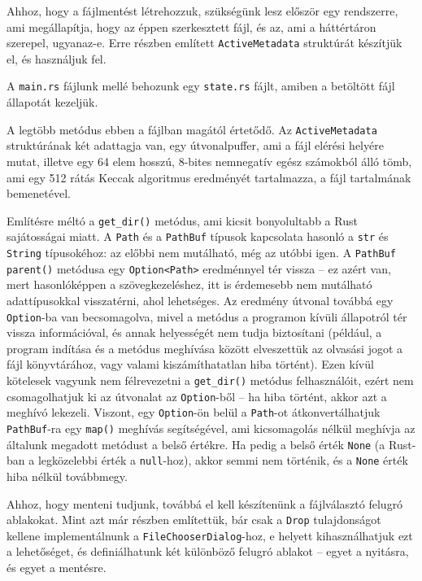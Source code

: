 Ahhoz, hogy a fájlmentést létrehozzuk, szükségünk lesz először egy rendszerre, ami megállapítja,
hogy az éppen szerkesztett fájl, és az, ami a háttértáron szerepel, ugyanaz-e.
Erre  részben említett \texttt{ActiveMetadata} struktúrát készítjük el,
és használjuk fel.

A \texttt{main.rs} fájlunk mellé behozunk egy \texttt{state.rs} fájlt, amiben a betöltött
fájl állapotát kezeljük.



A legtöbb metódus ebben a fájlban magától értetődő.
Az \texttt{ActiveMetadata} struktúrának két adattagja van, egy útvonalpuffer,
ami a fájl elérési helyére mutat, illetve egy 64 elem hosszú, 8-bites nemnegatív egész számokból álló tömb,
ami egy 512 rátás Keccak algoritmus eredményét tartalmazza, a fájl tartalmának bemenetével.

Említésre méltó a \verb+get_dir()+ metódus, ami kicsit bonyolultabb a Rust sajátosságai miatt.
A \texttt{Path} és a \texttt{PathBuf} típusok kapcsolata hasonló a \texttt{str} és \texttt{String}
típusokéhoz: az előbbi nem mutálható, még az utóbbi igen.
A \texttt{PathBuf} \texttt{parent()} metódusa egy \texttt{Option<Path>} eredménnyel tér vissza --
ez azért van, mert hasonlóképpen a szövegkezeléshez, itt is érdemesebb nem mutálható adattípusokkal
visszatérni, ahol lehetséges.
Az eredmény útvonal továbbá egy \texttt{Option}-ba van becsomagolva, mivel a metódus a programon
kívüli állapotról tér vissza információval, és annak helyességét nem tudja biztosítani
(például, a program indítása és a metódus meghívása között elveszettük az olvasási jogot a fájl
könyvtárához, vagy valami kiszámíthatatlan hiba történt).
Ezen kívül kötelesek vagyunk nem félrevezetni a \verb+get_dir()+ metódus felhasználóit,
ezért nem csomagolhatjuk ki az útvonalat az \texttt{Option}-ből --
ha hiba történt, akkor azt a meghívó lekezeli.
Viszont, egy \texttt{Option}-ön belül a \texttt{Path}-ot átkonvertálhatjuk \texttt{PathBuf}-ra 
egy \texttt{map()} meghívás segítségével, ami kicsomagolás nélkül meghívja az általunk megadott
metódust a belső értékre.
Ha pedig a belső érték \texttt{None} (a Rust-ban a legközelebbi érték a \texttt{null}-hoz),
akkor semmi nem történik, és a \texttt{None} érték hiba nélkül továbbmegy.

Ahhoz, hogy menteni tudjunk, továbbá el kell készítenünk a fájlválasztó felugró ablakokat.
Mint azt már  részben említettük, bár csak a \texttt{Drop} tulajdonságot
kellene implementálnunk a \texttt{FileChooserDialog}-hoz, e helyett kihasználhatjuk ezt a lehetőséget,
és definiálhatunk két különböző felugró ablakot --
egyet a nyitásra, és egyet a mentésre.

